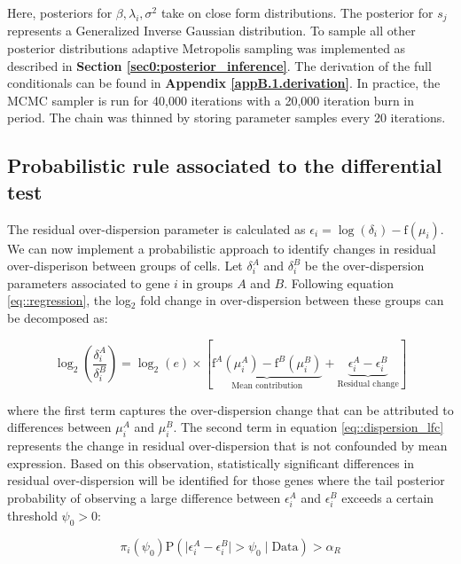 Here, posteriors for $\beta, \lambda_i, \sigma^2$ take on close form distributions. The posterior for $s_j$ represents a Generalized Inverse Gaussian distribution. To sample all other posterior distributions adaptive Metropolis sampling was implemented as described in \textbf{Section \ref{sec0:posterior_inference}}. The derivation of the full conditionals can be found in \textbf{Appendix  \ref{appB.1.derivation}}. In practice, the MCMC sampler is run for 40,000 iterations with a 20,000 iteration burn in period. The chain was thinned by storing parameter samples every 20 iterations.

\newpage

\subsection{Probabilistic rule associated to the differential test} \label{sec:differentialtest}

The residual over-dispersion parameter is calculated as $\epsilon_i=\log(\delta_i)-\text{f}(\mu_i)$. We can now implement a probabilistic approach to identify changes in residual over-disperison between groups of cells. Let $\delta_i^A$ and $\delta_i^B$ be the over-dispersion parameters associated to gene $i$ in groups $A$ and $B$. Following equation \eqref{eq::regression}, the log$_2$ fold change in over-dispersion between these groups can be decomposed as: 

\begin{equation} \label{eq::dispersion_lfc}
\log_2 \left( \frac{\delta_i^A}{\delta_i^B}\right) = \log_2(e) \times \left[\underbrace{\text{f}^A(\mu_i^A) - \text{f}^B(\mu_i^B) }_{\text{Mean contribution}} + \underbrace{\epsilon_i^A - \epsilon_i^B}_{\text{Residual change}} \right]
\end{equation} 

where the first term captures the over-dispersion change that can be attributed to differences between $\mu_i^A$ and $\mu_i^B$. The second term in equation \eqref{eq::dispersion_lfc} represents the change in residual over-dispersion that is not confounded by mean expression. Based on this observation, statistically significant differences in residual over-dispersion will be identified for those genes where the tail posterior probability of observing a large difference between $\epsilon_i^A$ and $\epsilon_i^B$ exceeds a certain threshold $\psi_0 > 0$:

\begin{equation} \label{eq::decision_rule}
\pi_i(\psi_0)\text{P}(\mid\epsilon_i^{A}-\epsilon_i^{B}\mid >\psi_0 \mid \text{Data} ) >\alpha_R
\end{equation}
 
